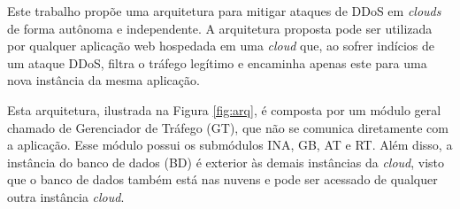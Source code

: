 



Este trabalho propõe uma arquitetura para mitigar ataques de DDoS em \emph{clouds} de forma autônoma e independente. A arquitetura proposta pode ser utilizada por qualquer aplicação web hospedada em uma \emph{cloud} que, ao sofrer indícios de um ataque DDoS, filtra o tráfego legítimo e encaminha apenas este para uma nova instância da mesma aplicação. 

Esta arquitetura, ilustrada na Figura \ref{fig:arq}, é composta por um módulo geral chamado de Gerenciador de Tráfego (GT), que não se comunica diretamente com a aplicação. Esse módulo possui os submódulos INA, GB, AT e RT. Além disso, a instância do banco de dados (BD) é exterior às demais instâncias da \emph{cloud}, visto que o banco de dados também está nas nuvens e pode ser acessado de qualquer outra instância \emph{cloud}. 


